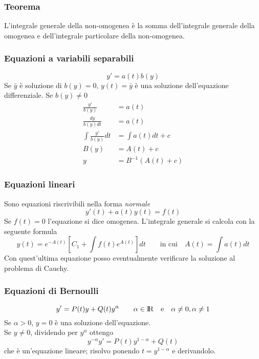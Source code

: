 \documentclass[10pt,a4paper,fleqn]{article}
\begin{document}
	\subsubsection{Teorema}
	L'integrale generale della non-omogenea è la somma dell'integrale generale della omogenea e dell'integrale particolare della non-omogenea.

	\subsubsection{Equazioni a variabili separabili}
	\begin{equation}
		y' = a(t)b(y)
	\end{equation}
	Se $\bar y$ è soluzione di $b(y) = 0$, $y(t) = \bar y$ è una soluzione dell'equazione differenziale.
	Se $b(y) \not = 0$
	\begin{align*}
		\frac{y'}{b(y)} &=a(t)\\
		\frac{dy}{b(y)dt} &= a(t)\\
		\int \frac{y'}{b(y)}dt &= \int a(t)dt + c\\
		B(y) &= A(t) + c\\
		y &= B^{-1}(A(t)+c)
	\end{align*}
	
	\subsubsection{Equazioni lineari}
	Sono equazioni riscrivibili nella forma \emph{normale}
	\begin{equation}
		y'(t) + a(t)y(t) = f(t)
	\end{equation}
	Se $f(t) = 0$ l'equazione si dice omogenea.
	L'integrale generale si calcola con la seguente formula
	\begin{equation}
		y(t)=e^{-A(t)}\left[C_1 + \int f(t)e^{A(t)}\right]dt \qquad \text{in cui}\quad A(t) = \int a(t)dt
	\end{equation}
	Con quest'ultima equazione posso eventualmente verificare la soluzione al problema di Cauchy.

	\subsubsection{Equazioni di Bernoulli}
	\begin{equation}
		y' = P(t)y + Q(t)y^\alpha \qquad \alpha \in \rm I\!R \quad\text{e}\quad \alpha \not = 0, \alpha \not = 1
	\end{equation}
	Se $\alpha > 0$, $y=0$ è una soluzione dell'equazione.\\
	Se $y\not = 0$, dividendo per $y^\alpha$ ottengo
	\begin{equation}
		y^{-\alpha}y' = P(t)y^{1-\alpha} + Q(t)
	\end{equation}
	che è un'equazione lineare; risolvo ponendo $t=y^{1-\alpha}$ e derivandolo.
\end{document}
